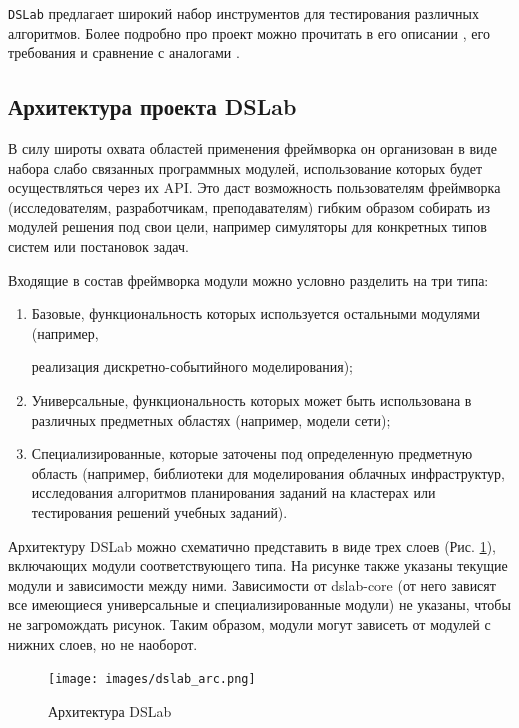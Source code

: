 \texttt{DSLab}\cite{dslab-repo} предлагает широкий набор инструментов для тестирования различных алгоритмов. Более подробно про проект можно прочитать в его описании \cite{dslab-description}, его требования \cite{dslab-requirements} и сравнение с аналогами \cite{dslab-analog-cmp}.

\subsection{Архитектура проекта DSLab}

В силу широты охвата областей применения фреймворка он организован в виде набора слабо связанных программных модулей, использование которых будет осуществляться через их API. Это даст возможность пользователям фреймворка (исследователям, разработчикам, преподавателям) гибким образом собирать из модулей решения под свои цели, например симуляторы для конкретных типов систем или постановок задач.

Входящие в состав фреймворка модули можно условно разделить на три типа:
\begin{enumerate}
    \item 
    Базовые, функциональность которых используется остальными модулями (например, 
    
    реализация дискретно-событийного моделирования);
    \item
    Универсальные, функциональность которых может быть использована в различных предметных областях (например, модели сети);
    \item
    Специализированные, которые заточены под определенную предметную область (например, библиотеки для моделирования облачных инфраструктур, исследования алгоритмов планирования заданий на кластерах или тестирования решений учебных заданий).
\end{enumerate}

Архитектуру DSLab можно схематично представить в виде трех слоев (Рис. \ref{dslab_arc}), включающих модули соответствующего типа. На рисунке также указаны текущие модули и зависимости между ними. Зависимости от dslab-core (от него зависят все имеющиеся универсальные и специализированные модули) не указаны, чтобы не загромождать рисунок. Таким образом, модули могут зависеть от модулей с нижних слоев, но не наоборот.

\begin{figure}[H]
    \centering
    \texttt{[image: images/dslab\_arc.png]}
    \caption{Архитектура DSLab}
    \label{dslab_arc}
\end{figure}

